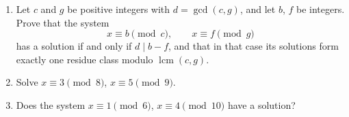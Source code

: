 \begin{enumerate}
\item[(a)] Let $c$ and $g$ be positive integers with $d=\gcd(c,g)$, and let $b$, $f$ be integers. Prove that the system
\[
x\equiv b\pmod c,\qquad x\equiv f\pmod g
\]
has a solution if and only if $d\mid b-f$, and that in that case its solutions form exactly one residue class modulo $\operatorname{lcm}(c,g)$.
\item[(b)] Solve $x\equiv3\pmod8$, $x\equiv5\pmod9$.
\item[(c)] Does the system $x\equiv1\pmod6$, $x\equiv4\pmod{10}$ have a solution?
\end{enumerate}
